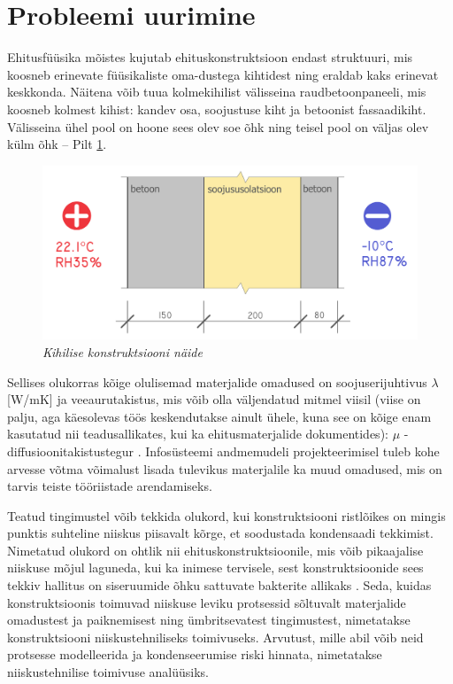 \section{Probleemi uurimine}
\label{chapters:problem_statement_research}

Ehitusfüüsika mõistes kujutab ehituskonstruktsioon endast struktuuri, mis koosneb erinevate füüsikaliste oma-dustega kihtidest 
 ning eraldab kaks erinevat keskkonda. Näitena võib tuua kolmekihilist välisseina raudbetoonpaneeli,
mis koosneb kolmest kihist: kandev osa, soojustuse kiht ja betoonist fassaadikiht. Välisseina ühel pool on 
hoone sees olev soe õhk ning teisel pool on väljas olev külm õhk -- Pilt \ref{fig:construction_sample}. 

\begin{figure}[ht]
    \centering
    \includegraphics[width=.8\textwidth]{figures/problem_statement/07_layered_structure_sample.png}
    \caption[Mitmest kihist koosneva ehituskonstruktsiooni näide]{\textit{Kihilise konstruktsiooni näide}}
    \label{fig:construction_sample}
\end{figure}

Sellises olukorras kõige olulisemad materjalide omadused on soojuserijuhtivus \begin{math}\lambda\end{math} [W/mK]
ja veeaurutakistus, mis võib olla väljendatud mitmel viisil (viise on palju, aga käesolevas töös keskendutakse 
ainult ühele, kuna see on kõige enam kasutatud nii teadusallikates, kui ka ehitusmaterjalide dokumentides):
\begin{math}\mu\end{math} - diffusioonitakistustegur \cite{building_physics_abc}. Infosüsteemi andmemudeli projekteerimisel tuleb kohe arvesse võtma
võimalust lisada tulevikus materjalile ka muud omadused, mis on tarvis teiste tööriistade arendamiseks.

Teatud tingimustel võib tekkida olukord, kui konstruktsiooni ristlõikes on mingis punktis suhteline niiskus
piisavalt kõrge, et soodustada kondensaadi tekkimist. Nimetatud olukord on ohtlik
nii ehituskonstruktsioonile, mis võib pikaajalise niiskuse mõjul laguneda, kui ka inimese tervisele, sest konstruktsioonide
sees tekkiv hallitus on siseruumide õhku sattuvate bakterite allikaks \cite{rokka_hygrothermal}.    
Seda, kuidas konstruktsioonis toimuvad niiskuse leviku protsessid sõltuvalt materjalide omadustest ja 
paiknemisest ning ümbritsevatest tingimustest, nimetatakse konstruktsiooni niiskustehniliseks toimivuseks. Arvutust,
mille abil võib neid protsesse modelleerida ja kondenseerumise riski hinnata, nimetatakse niiskustehnilise toimivuse
analüüsiks.

